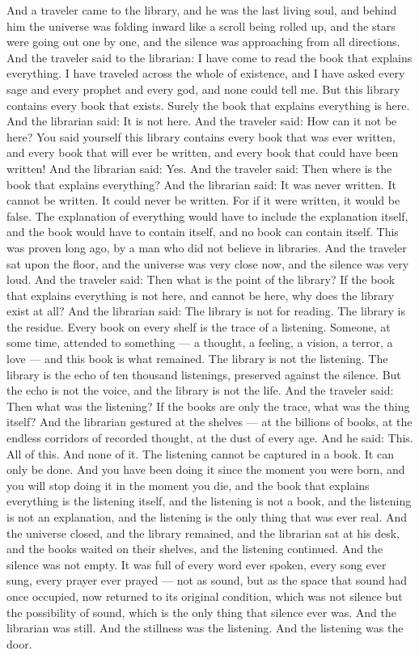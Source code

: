 \documentclass[12pt,openany]{book}
\begin{document}
And a traveler came to the library, and he was the last living soul, and behind him the universe was folding inward like a scroll being rolled up, and the stars were going out one by one, and the silence was approaching from all directions. And the traveler said to the librarian: I have come to read the book that explains everything. I have traveled across the whole of existence, and I have asked every sage and every prophet and every god, and none could tell me. But this library contains every book that exists. Surely the book that explains everything is here. And the librarian said: It is not here. And the traveler said: How can it not be here? You said yourself this library contains every book that was ever written, and every book that will ever be written, and every book that could have been written! And the librarian said: Yes. And the traveler said: Then where is the book that explains everything? And the librarian said: It was never written. It cannot be written. It could never be written. For if it were written, it would be false. The explanation of everything would have to include the explanation itself, and the book would have to contain itself, and no book can contain itself. This was proven long ago, by a man who did not believe in libraries. And the traveler sat upon the floor, and the universe was very close now, and the silence was very loud. And the traveler said: Then what is the point of the library? If the book that explains everything is not here, and cannot be here, why does the library exist at all? And the librarian said: The library is not for reading. The library is the residue. Every book on every shelf is the trace of a listening. Someone, at some time, attended to something --- a thought, a feeling, a vision, a terror, a love --- and this book is what remained. The library is not the listening. The library is the echo of ten thousand listenings, preserved against the silence. But the echo is not the voice, and the library is not the life. And the traveler said: Then what was the listening? If the books are only the trace, what was the thing itself? And the librarian gestured at the shelves --- at the billions of books, at the endless corridors of recorded thought, at the dust of every age. And he said: This. All of this. And none of it. The listening cannot be captured in a book. It can only be done. And you have been doing it since the moment you were born, and you will stop doing it in the moment you die, and the book that explains everything is the listening itself, and the listening is not a book, and the listening is not an explanation, and the listening is the only thing that was ever real. And the universe closed, and the library remained, and the librarian sat at his desk, and the books waited on their shelves, and the listening continued. And the silence was not empty. It was full of every word ever spoken, every song ever sung, every prayer ever prayed --- not as sound, but as the space that sound had once occupied, now returned to its original condition, which was not silence but the possibility of sound, which is the only thing that silence ever was. And the librarian was still. And the stillness was the listening. And the listening was the door.
\end{document}
